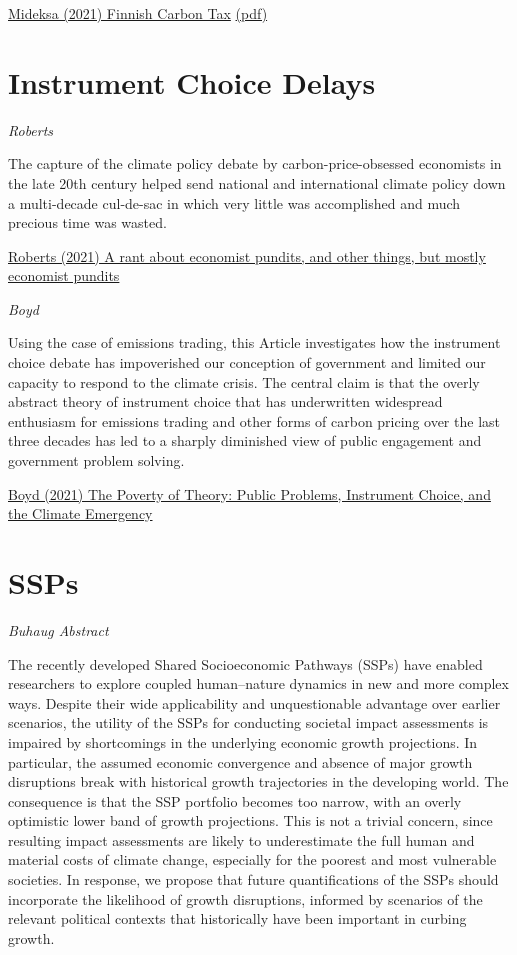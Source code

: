 \documentclass[
]{book}
\begin{document}
\href{https://www.cesifo.org/en/publikationen/2021/working-paper/pricing-cooler-planet-empirical-analysis-effect-taxing-carbon}{Mideksa (2021) Finnish Carbon Tax}
\href{pdf/Mideksa_2021_Finnish_Carbon_Tax.pdf}{(pdf)}

\hypertarget{instrument-choice-delays}{%
\section{Instrument Choice Delays}\label{instrument-choice-delays}}

\emph{Roberts}

The capture of the climate policy debate by carbon-price-obsessed economists in the late 20th century helped send national and international climate policy down a multi-decade cul-de-sac in which very little was accomplished and much precious time was wasted.

\href{https://www.volts.wtf/p/a-rant-about-economist-pundits-and}{Roberts (2021) A rant about economist pundits, and other things, but mostly economist pundits}

\emph{Boyd}

Using the case of emissions trading, this Article investigates how the instrument choice debate has impoverished our conception of government and limited our capacity to respond to the climate crisis. The central claim is that the overly abstract theory of instrument choice that has underwritten widespread enthusiasm for emissions trading and other forms of carbon pricing over the last three decades has led to a sharply diminished view of public engagement and government problem solving.

\href{https://journals.library.columbia.edu/index.php/cjel/article/view/8401/4300}{Boyd (2021) The Poverty of Theory: Public Problems, Instrument Choice, and the Climate Emergency}

\hypertarget{ssps}{%
\section{SSPs}\label{ssps}}

\emph{Buhaug Abstract}

The recently developed Shared Socioeconomic Pathways (SSPs) have enabled researchers to explore coupled human--nature dynamics in new and more complex ways. Despite their wide applicability and unquestionable advantage over earlier scenarios, the utility of the SSPs for conducting societal impact assessments is impaired by shortcomings in the underlying economic growth projections. In particular, the assumed economic convergence and absence of major growth disruptions break with historical growth trajectories in the developing world. The consequence is that the SSP portfolio becomes too narrow, with an overly optimistic lower band of growth projections. This is not a trivial concern, since resulting impact assessments are likely to underestimate the full human and material costs of climate change, especially for the poorest and most vulnerable societies. In response, we propose that future quantifications of the SSPs should incorporate the likelihood of growth disruptions, informed by scenarios of the relevant political contexts that historically have been important in curbing growth.
\end{document}
